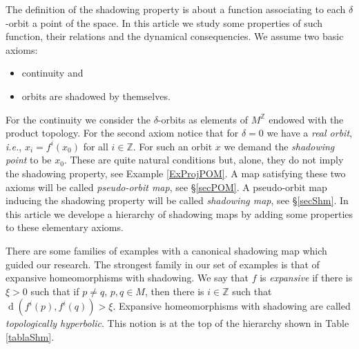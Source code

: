 \documentclass[12pt]{amsart}
\theoremstyle{plain}
\theoremstyle{definition}
\theoremstyle{remark}
\DeclareMathOperator{\dist}{d}
\newcommand{\Z}{\mathbb Z}
\newcommand{\expc}{\xi}
\begin{document}
The definition of the shadowing property is about a function associating to each $\delta$-orbit a point of the space.
In this article we study some properties of such function, their relations and the dynamical consequencies.
We assume two basic axioms:
\begin{itemize}
	\item continuity and
	\item orbits are shadowed by themselves.
\end{itemize}
For the continuity we consider the $\delta$-orbits as elements of $M^\Z$ endowed with the product topology.
For the second axiom notice that for $\delta=0$ we have a \textit{real orbit}, \textit{i.e.}, $x_i=f^i(x_0)$ for all $i\in\Z$. For such an orbit $x$ we demand the \textit{shadowing point} to be $x_0$. These are quite natural conditions but, alone, they do not imply the shadowing property, see Example \ref{ExProjPOM}. A map satisfying these two axioms will be called \textit{pseudo-orbit map}, see \S\ref{secPOM}.
A pseudo-orbit map inducing the shadowing property will be called \textit{shadowing map}, see \S\ref{secShm}.
In this article we develope a hierarchy of shadowing maps by adding some properties to these elementary axioms.

There are some families of examples with a canonical shadowing map which guided our research.
The strongest family in our set of examples is that of
expansive homeomorphisms with shadowing.
We say that $f$ is \textit{expansive} if there is $\expc>0$ such that if $p\neq q$, $p,q\in M$, then there is $i\in\Z$ such that $\dist(f^i(p),f^i(q))>\expc$.
Expansive homeomorphisms with shadowing are called \textit{topologically hyperbolic}.
This notion is at the top of the hierarchy shown in Table \ref{tablaShm}.
\end{document}
